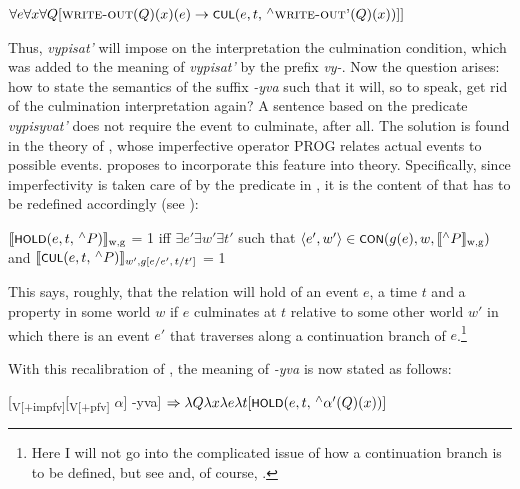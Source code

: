 \documentclass[output=paper,colorlinks,citecolor=brown]{langscibook}
\begin{document}
\ea
\label{zucmp} 
$\forall e \forall x \forall Q [\textsc{write-out}(Q)(x)(e) \rightarrow  \cnst{Cul}(e,t, \,^\wedge \textsc{write-out'}(Q)(x))]]$
\z

\noindent Thus, \textit{vypisat'} will impose on the interpretation the culmination condition, which was added to the meaning of \textit{vypisat'} by the prefix \textit{vy-}. Now the question arises: how to state the semantics of the suffix \textit{-yva} such that it will, so to speak, get rid of the culmination interpretation again? A sentence based on the predicate \textit{vy\-pisyvat'} does not require the event to culminate, after all. 
The solution is found in the theory of \citet{Landman92}, whose  imperfective operator PROG relates actual events to possible events. \citet{Zucchi1999} proposes to incorporate this feature into  theory. Specifically, since imperfectivity is taken care of by the predicate  in \citet{Parsons1990}, it is the content of  that has to be redefined accordingly (see \citealt[194]{Zucchi1999}):  

\ea
\label{zuchold1} 
$\llbracket \cnst{Hold}(e,t,\,^\wedge P)\rrbracket\textsubscript{w,g}$ = 1 iff $\exists e' \exists w' \exists t'$ such that 
$\langle e', w'\rangle \in \cnst{CON}(g(e),w,\llbracket ^\wedge P\rrbracket \textsubscript{w,g})$  and $\llbracket \cnst{Cul}(e,t,\,^\wedge P)\rrbracket 
_{w',g[e/e',\,t/t']}$ = 1
\z



\noindent This says, roughly, that the relation  will hold of an event $e$, a time $t$ and a property in some world $w$ if $e$ culminates at $t$ relative to some other world $w'$ in which there is an event $e'$ that traverses along a continuation branch of $e$.\footnote{Here I will not go into the complicated issue of how a continuation branch is to be defined, but see \citet[214]{Zucchi1999} and, of course, \citet{Landman92}.} 

With this recalibration of , the meaning of \textit{-yva} is now stated as follows:

\ea
\label{zucyva} 
[\textsubscript{V[+impfv]}[\textsubscript{V[+pfv]} $\alpha $] -yva] $\Rightarrow \lambda Q \lambda x \lambda e \lambda t [\cnst{Hold} (e,t,\,^\wedge \alpha'(Q)(x))]$
\z
\end{document}
